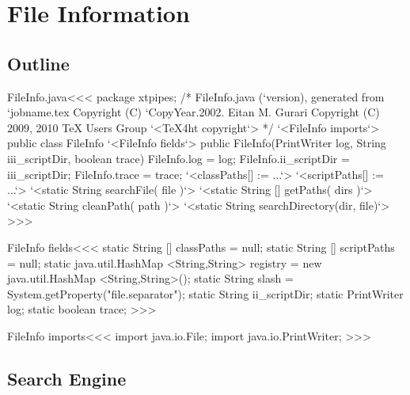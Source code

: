 \documentclass{article}
\begin{document}
\section{File Information}


\subsection{Outline}




% 


\<FileInfo.java\><<<
package xtpipes;
/* FileInfo.java (`version), generated from `jobname.tex
   Copyright (C) `CopyYear.2002. Eitan M. Gurari
   Copyright (C) 2009, 2010 TeX Users Group
`<TeX4ht copyright`> */
`<FileInfo imports`>
public class FileInfo{
     `<FileInfo fields`>
   public FileInfo(PrintWriter log, String iii_scriptDir, boolean trace) {
      FileInfo.log = log;
      FileInfo.ii_scriptDir = iii_scriptDir;
      FileInfo.trace = trace;
      `<classPaths[] := ...`>
      `<scriptPaths[] := ...`>
   }
   `<static String searchFile( file )`>
   `<static String [] getPaths( dirs )`>
   `<static String cleanPath( path )`>
   `<static String searchDirectory(dir, file)`>
}
>>>

\<FileInfo fields\><<<
static String [] classPaths = null;
static String [] scriptPaths = null;
static java.util.HashMap <String,String> registry =
                                  new java.util.HashMap <String,String>();
static String slash = System.getProperty("file.separator");
static String ii_scriptDir;
static PrintWriter log;
static boolean trace;
>>>


\<FileInfo imports\><<<
import java.io.File;
import java.io.PrintWriter;
>>>

\subsection{Search Engine}
\end{document}
